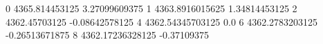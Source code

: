 0 4365.814453125 3.27099609375
1 4363.8916015625 1.34814453125
2 4362.45703125 -0.08642578125
4 4362.54345703125 0.0
6 4362.2783203125 -0.26513671875
8 4362.17236328125 -0.37109375
